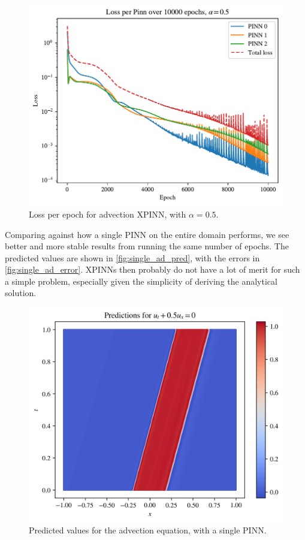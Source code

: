 \begin{figure}[h]
    \centering
    \includegraphics[width=0.8\linewidth]{Project1XPINNs/figures/advection/Loss per Pinn over 10000 epochs, alpha=0.5_10000.pdf}
    \caption{Loss per epoch for advection XPINN, with $\alpha=0.5$.}
    \label{fig:loss_per_advection}
\end{figure}

Comparing against how a single PINN on the entire domain performs, we see better and more stable results from running the same number of epochs.
The predicted values are shown in \autoref{fig:single_ad_pred}, with the errors in \autoref{fig:single_ad_error}.
XPINNs then probably do not have a lot of merit for such a simple problem, especially given the simplicity of deriving the analytical solution.

\begin{figure}[h]
    \centering
    \includegraphics[width=0.8\linewidth]{Project1XPINNs/figures/advection/single_0.5_predictions.png}
    \caption{Predicted values for the advection equation, with a single PINN.}
    \label{fig:single_ad_pred}
\end{figure}

